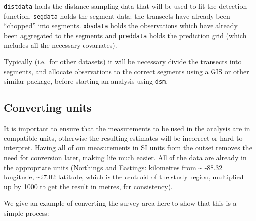 \documentclass[]{amsart}
\newenvironment{Shaded}{}{}
\newcommand{\KeywordTok}[1]{\textcolor[rgb]{0.00,0.44,0.13}{\textbf{{#1}}}}
\newcommand{\DataTypeTok}[1]{\textcolor[rgb]{0.56,0.13,0.00}{{#1}}}
\newcommand{\DecValTok}[1]{\textcolor[rgb]{0.25,0.63,0.44}{{#1}}}
\newcommand{\FloatTok}[1]{\textcolor[rgb]{0.25,0.63,0.44}{{#1}}}
\newcommand{\StringTok}[1]{\textcolor[rgb]{0.25,0.44,0.63}{{#1}}}
\newcommand{\CommentTok}[1]{\textcolor[rgb]{0.38,0.63,0.69}{\textit{{#1}}}}
\newcommand{\NormalTok}[1]{{#1}}
\begin{document}
\texttt{distdata} holds the distance sampling data that will be used to
fit the detection function. \texttt{segdata} holds the segment data: the
transects have already been ``chopped'' into segments. \texttt{obsdata}
holds the observations which have already been aggregated to the
segments and \texttt{preddata} holds the prediction grid (which includes
all the necessary covariates).

Typically (i.e.~for other datasets) it will be necessary divide the
transects into segments, and allocate observations to the correct
segments using a GIS or other similar package, before starting an
analysis using \texttt{dsm}.

\subsection{Converting units}

It is important to ensure that the measurements to be used in the
analysis are in compatible units, otherwise the resulting estimates will
be incorrect or hard to interpret. Having all of our measurements in SI
units from the outset removes the need for conversion later, making life
much easier. All of the data are already in the appropriate units
(Northings and Eastings: kilometres from \textasciitilde{} -88.32
longitude, \textasciitilde{}27.02 latitude, which is the centroid of the
study region, multiplied up by 1000 to get the result in metres, for
consistency).

We give an example of converting the survey area here to show that this
is a simple process:

\begin{Shaded}
\end{Shaded}
\end{document}

